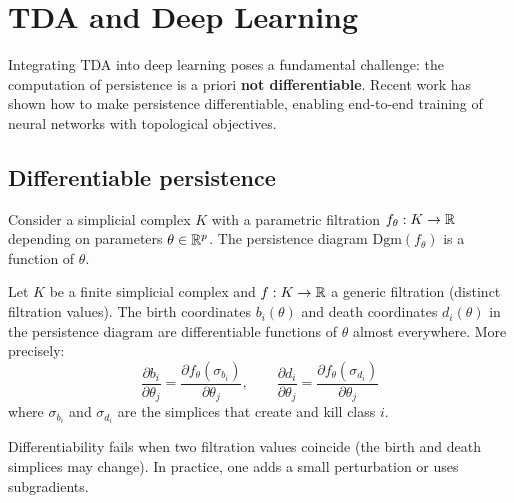 \chapter{TDA and Deep Learning}
\label{ch:deep_tda}

\begin{intuition}
Integrating TDA into deep learning poses a fundamental challenge:
the computation of persistence is a priori \textbf{not differentiable}.
Recent work has shown how to make persistence differentiable, enabling
end-to-end training of neural networks with topological objectives.
\end{intuition}

\section{Differentiable persistence}
\label{sec:diff_persistence}

\begin{definition}
Consider a simplicial complex $K$ with a parametric filtration
$f_\theta : K \to \mathbb{R}$ depending on parameters $\theta \in \mathbb{R}^p$.
The persistence diagram $\mathrm{Dgm}(f_\theta)$ is a function
of $\theta$.
\end{definition}

\begin{theorem}
\label{thm:diff_persistence}
Let $K$ be a finite simplicial complex and $f : K \to \mathbb{R}$ a generic
filtration (distinct filtration values). The birth coordinates
$b_i(\theta)$ and death coordinates $d_i(\theta)$ in the persistence
diagram are differentiable functions of $\theta$ almost everywhere.
More precisely:
\[
  \frac{\partial b_i}{\partial \theta_j} =
  \frac{\partial f_\theta(\sigma_{b_i})}{\partial \theta_j}, \qquad
  \frac{\partial d_i}{\partial \theta_j} =
  \frac{\partial f_\theta(\sigma_{d_i})}{\partial \theta_j}
\]
where $\sigma_{b_i}$ and $\sigma_{d_i}$ are the simplices that
create and kill class $i$.
\end{theorem}

\begin{attention}[title=\textbf{Non-differentiability points}]
Differentiability fails when two filtration values coincide
(the birth and death simplices may change). In practice, one adds
a small perturbation or uses subgradients.
\end{attention}

